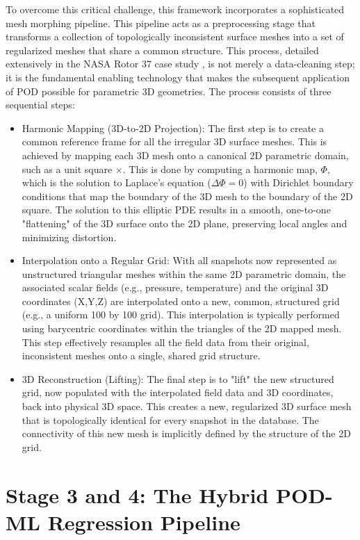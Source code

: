 \documentclass[dscexam, EN]{ufabcFHZh}
\begin{document}
To overcome this critical challenge, this framework incorporates a sophisticated mesh morphing pipeline. This pipeline acts as a preprocessing stage that transforms a collection of topologically inconsistent surface meshes into a set of regularized meshes that share a common structure. This process, detailed extensively in the NASA Rotor 37 case study , is not merely a data-cleaning step; it is the fundamental enabling technology that makes the subsequent application of POD possible for parametric 3D geometries. The process consists of three sequential steps: 

\begin{itemize}
    \item Harmonic Mapping (3D-to-2D Projection): The first step is to create a common reference frame for all the irregular 3D surface meshes. This is achieved by mapping each 3D mesh onto a canonical 2D parametric domain, such as a unit square $ \times $. This is done by computing a harmonic map, $\Phi$, which is the solution to Laplace's equation ($\Delta\Phi=0$) with Dirichlet boundary conditions that map the boundary of the 3D mesh to the boundary of the 2D square. The solution to this elliptic PDE results in a smooth, one-to-one "flattening" of the 3D surface onto the 2D plane, preserving local angles and minimizing distortion. 

    \item Interpolation onto a Regular Grid: With all snapshots now represented as unstructured triangular meshes within the same 2D parametric domain, the associated scalar fields (e.g., pressure, temperature) and the original 3D coordinates (X,Y,Z) are interpolated onto a new, common, structured grid (e.g., a uniform 100 by 100 grid). This interpolation is typically performed using barycentric coordinates within the triangles of the 2D mapped mesh. This step effectively resamples all the field data from their original, inconsistent meshes onto a single, shared grid structure. 

    \item 3D Reconstruction (Lifting): The final step is to "lift" the new structured grid, now populated with the interpolated field data and 3D coordinates, back into physical 3D space. This creates a new, regularized 3D surface mesh that is topologically identical for every snapshot in the database. The connectivity of this new mesh is implicitly defined by the structure of the 2D grid. 
\end{itemize}

\section{Stage 3 and 4: The Hybrid POD-ML Regression Pipeline}
\end{document}
